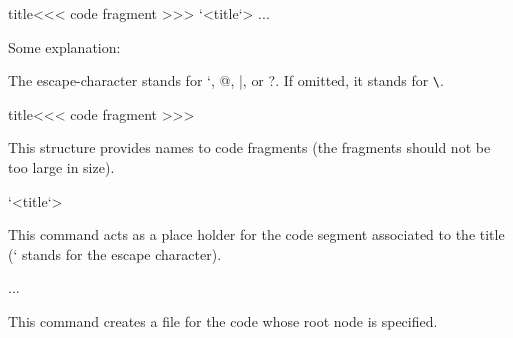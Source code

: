 \begin{texsource}

\<title\><<<
code fragment
>>>  
`<title`>
\OutputCode\<...\> 
\end{texsource}

Some explanation:

\begin{texsource}

\end{texsource}

The escape-character stands for `, @, |, or ?. If omitted, it stands for \verb|\|. 

\begin{texsource}
\<title\><<<
code fragment
>>>

\end{texsource}

This structure provides names to code fragments (the fragments should not be too large in size).


\begin{texsource}
 `<title`>
 \end{texsource}

This command acts as a place holder for the code segment associated to the title (` stands for the escape character). 

\begin{texsource}
   \OutputCode\<...\>
 \end{texsource}

This command creates a file for the code whose root node is specified.




